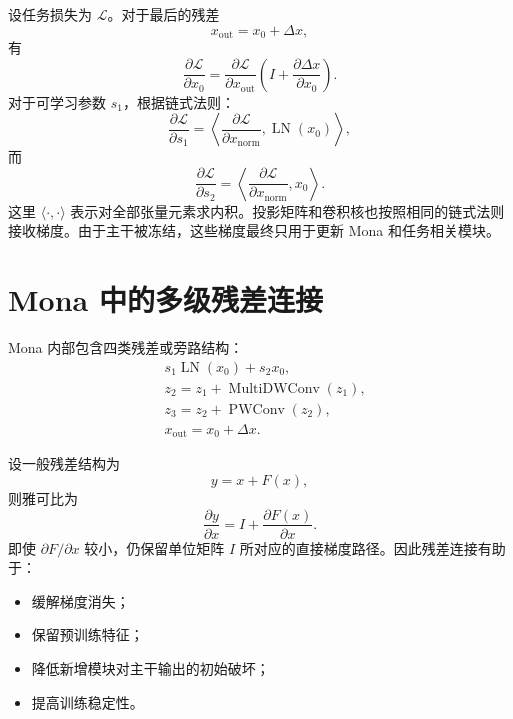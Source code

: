 \documentclass[UTF8,12pt,a4paper,fontset=none]{ctexart}
\newcommand{\Loss}{\mathcal{L}}
\newcommand{\LN}{\operatorname{LN}}
\begin{document}
设任务损失为 $\Loss$。对于最后的残差
\begin{equation}
 x_{\mathrm{out}}=x_0+\Delta x,
\end{equation}
有
\begin{equation}
 \frac{\partial\Loss}{\partial x_0}
 =\frac{\partial\Loss}{\partial x_{\mathrm{out}}}
 \left(I+\frac{\partial\Delta x}{\partial x_0}\right).
\end{equation}
对于可学习参数 $s_1$，根据链式法则：
\begin{equation}
 \frac{\partial\Loss}{\partial s_1}
 =\left\langle
 \frac{\partial\Loss}{\partial x_{\mathrm{norm}}},
 \LN(x_0)
 \right\rangle,
\end{equation}
而
\begin{equation}
 \frac{\partial\Loss}{\partial s_2}
 =\left\langle
 \frac{\partial\Loss}{\partial x_{\mathrm{norm}}},
 x_0
 \right\rangle.
\end{equation}
这里 $\langle\cdot,\cdot\rangle$ 表示对全部张量元素求内积。投影矩阵和卷积核也按照相同的链式法则接收梯度。由于主干被冻结，这些梯度最终只用于更新 Mona 和任务相关模块。

\section{Mona 中的多级残差连接}

Mona 内部包含四类残差或旁路结构：
\begin{align}
 &s_1\LN(x_0)+s_2x_0,\\
 &z_2=z_1+\operatorname{MultiDWConv}(z_1),\\
 &z_3=z_2+\operatorname{PWConv}(z_2),\\
 &x_{\mathrm{out}}=x_0+\Delta x.
\end{align}

设一般残差结构为
\begin{equation}
 y=x+F(x),
\end{equation}
则雅可比为
\begin{equation}
 \frac{\partial y}{\partial x}
 =I+\frac{\partial F(x)}{\partial x}.
\end{equation}
即使 $\partial F/\partial x$ 较小，仍保留单位矩阵 $I$ 所对应的直接梯度路径。因此残差连接有助于：
\begin{itemize}
  \item 缓解梯度消失；
  \item 保留预训练特征；
  \item 降低新增模块对主干输出的初始破坏；
  \item 提高训练稳定性。
\end{itemize}
\end{document}
